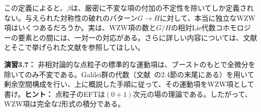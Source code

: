 この定義によると、$\beta$は、厳密に不変な項の付加の不定性を除いてしか定義されない。与えられた対称性の破れのパターン$G \to H$に対して、本当に独立なWZW項はいくつあるだろうか。実は、WZW項の数と$G/H$の相対Lie代数コホモロジーの要素との間には、一対一の対応がある。さらに詳しい内容については、文献\cite{Goon:2012dy}とそこで挙げられた文献を参照してほしい。
%
\begin{eBox}
%
{\bf 演習3.7：} 非相対論的な点粒子の標準的な運動項は、ブーストのもとで全微分を除いてのみ不変である。Galilei群の代数（文献~\cite{Weinberg:1995mt}の2.4節の末尾にある）を用いて剰余空間構成を行い、上に概説した手順に従って、その運動項をWZW項として書け。{\bf ヒント：} 点粒子のEFTは$(0+1)$次元の場の理論である。したがって、WZW項は完全な2形式の積分である。
%
\end{eBox}
%


 \label{sec: chiral anomalies}


